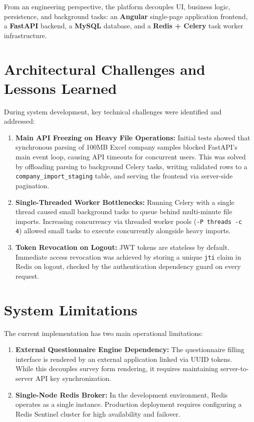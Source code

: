 \documentclass[12pt,a4paper]{report}
\begin{document}
From an engineering perspective, the platform decouples UI, business logic, persistence, and background tasks: an \textbf{Angular} single-page application frontend, a \textbf{FastAPI} backend, a \textbf{MySQL} database, and a \textbf{Redis + Celery} task worker infrastructure.

\section*{Architectural Challenges and Lessons Learned}
During system development, key technical challenges were identified and addressed:
\begin{enumerate}
    \item \textbf{Main API Freezing on Heavy File Operations:} Initial tests showed that synchronous parsing of 100MB Excel company samples blocked FastAPI's main event loop, causing API timeouts for concurrent users. This was solved by offloading parsing to background Celery tasks, writing validated rows to a \texttt{company\_import\_staging} table, and serving the frontend via server-side pagination.
    \item \textbf{Single-Threaded Worker Bottlenecks:} Running Celery with a single thread caused small background tasks to queue behind multi-minute file imports. Increasing concurrency via threaded worker pools (\texttt{-P threads -c 4}) allowed small tasks to execute concurrently alongside heavy imports.
    \item \textbf{Token Revocation on Logout:} JWT tokens are stateless by default. Immediate access revocation was achieved by storing a unique \texttt{jti} claim in Redis on logout, checked by the authentication dependency guard on every request.
\end{enumerate}

\section*{System Limitations}
The current implementation has two main operational limitations:
\begin{enumerate}
    \item \textbf{External Questionnaire Engine Dependency:} The questionnaire filling interface is rendered by an external application linked via UUID tokens. While this decouples survey form rendering, it requires maintaining server-to-server API key synchronization.
    \item \textbf{Single-Node Redis Broker:} In the development environment, Redis operates as a single instance. Production deployment requires configuring a Redis Sentinel cluster for high availability and failover.
\end{enumerate}
\end{document}
